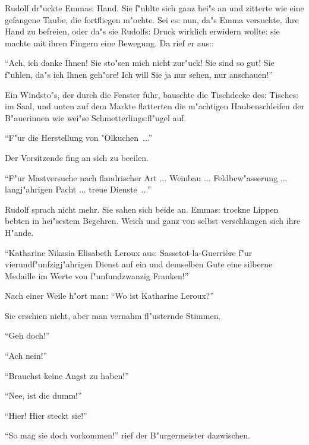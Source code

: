 \documentclass[oneside,12pt]{book}
\newcommand{\s}{s:}%
\begin{document}
Rudolf dr"uckte Emma{\s} Hand. Sie f"uhlte sich ganz hei"s an und
zitterte wie eine gefangene Taube, die fortfliegen m"ochte. Sei
e{\s} nun, da"s Emma versuchte, ihre Hand zu befreien, oder da"s
sie Rudolf{\s} Druck wirklich erwidern wollte: sie machte mit
ihren Fingern eine Bewegung. Da rief er au{\s}:

"`Ach, ich danke Ihnen! Sie sto"sen mich nicht zur"uck! Sie sind
so gut! Sie f"uhlen, da"s ich Ihnen geh"ore! Ich will Sie ja nur
sehen, nur anschauen!"'

Ein Windsto"s, der durch die Fenster fuhr, bauschte die Tischdecke
de{\s} Tische{\s} im Saal, und unten auf dem Markte flatterten die
m"achtigen Haubenschleifen der B"auerinnen wie wei"se
Schmetterling{\s}fl"ugel auf.

"`F"ur die Herstellung von "Olkuchen~..."'

Der Vorsitzende fing an sich zu beeilen.

"`F"ur Mastversuche nach flandrischer Art ... Weinbau ...
Feldbew"asserung ... langj"ahrigen Pacht ... treue Dienste~..."'

Rudolf sprach nicht mehr. Sie sahen sich beide an. Emma{\s}
trockne Lippen bebten in hei"sestem Begehren. Weich und ganz von
selbst verschlangen sich ihre H"ande.

"`Katharine Nikasia Elisabeth Leroux au{\s} Sassetot-la-Guerri\`ere
f"ur vier\-und\-f"unfzig\-j"ahrigen Dienst auf ein und demselben
Gute eine silberne Medaille im Werte von f"unfundzwanzig Franken!"'

Nach einer Weile h"ort man: "`Wo ist Katharine Leroux?"'

Sie erschien nicht, aber man vernahm fl"usternde Stimmen.

"`Geh doch!"'

"`Ach nein!"'

"`Brauchst keine Angst zu haben!"'

"`Nee, ist die dumm!"'

"`Hier! Hier steckt sie!"'

"`So mag sie doch vorkommen!"' rief der B"urgermeister dazwischen.
\end{document}
